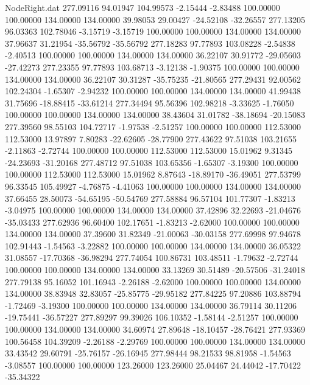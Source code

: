 \begin{filecontents}{NodeRight.dat}
 277.09116   94.01947  104.99573    -2.15444   -2.83488  100.00000  100.00000  134.00000  134.00000   39.98053   29.00427  -24.52108  -32.26557
 277.13205   96.03363  102.78046    -3.15719   -3.15719  100.00000  100.00000  134.00000  134.00000   37.96637   31.21954  -35.56792  -35.56792
 277.18283   97.77893  103.08228    -2.54838   -2.40513  100.00000  100.00000  134.00000  134.00000   36.22107   30.91772  -29.05603  -27.42273
 277.23355   97.77893  103.68713    -3.12138   -1.90375  100.00000  100.00000  134.00000  134.00000   36.22107   30.31287  -35.75235  -21.80565
 277.29431   92.00562  102.24304    -1.65307   -2.94232  100.00000  100.00000  134.00000  134.00000   41.99438   31.75696  -18.88415  -33.61214
 277.34494   95.56396  102.98218    -3.33625   -1.76050  100.00000  100.00000  134.00000  134.00000   38.43604   31.01782  -38.18694  -20.15083
 277.39560   98.55103  104.72717    -1.97538   -2.51257  100.00000  100.00000  112.53000  112.53000   13.97897    7.80283  -22.62605  -28.77900
 277.43622   97.51038  103.21655    -2.11863   -2.72744  100.00000  100.00000  112.53000  112.53000   15.01962    9.31345  -24.23693  -31.20168
 277.48712   97.51038  103.65356    -1.65307   -3.19300  100.00000  100.00000  112.53000  112.53000   15.01962    8.87643  -18.89170  -36.49051
 277.53799   96.33545  105.49927    -4.76875   -4.41063  100.00000  100.00000  134.00000  134.00000   37.66455   28.50073  -54.65195  -50.54769
 277.58884   96.57104  101.77307    -1.83213   -3.04975  100.00000  100.00000  134.00000  134.00000   37.42896   32.22693  -21.04676  -35.03433
 277.62936   96.60400  102.17651    -1.83213   -2.62000  100.00000  100.00000  134.00000  134.00000   37.39600   31.82349  -21.00063  -30.03158
 277.69998   97.94678  102.91443    -1.54563   -3.22882  100.00000  100.00000  134.00000  134.00000   36.05322   31.08557  -17.70368  -36.98294
 277.74054  100.86731  103.48511    -1.79632   -2.72744  100.00000  100.00000  134.00000  134.00000   33.13269   30.51489  -20.57506  -31.24018
 277.79138   95.16052  101.16943    -2.26188   -2.62000  100.00000  100.00000  134.00000  134.00000   38.83948   32.83057  -25.85775  -29.95182
 277.84225   97.20886  103.88794    -1.72469   -3.19300  100.00000  100.00000  134.00000  134.00000   36.79114   30.11206  -19.75441  -36.57227
 277.89297   99.39026  106.10352    -1.58144   -2.51257  100.00000  100.00000  134.00000  134.00000   34.60974   27.89648  -18.10457  -28.76421
 277.93369  100.56458  104.39209    -2.26188   -2.29769  100.00000  100.00000  134.00000  134.00000   33.43542   29.60791  -25.76157  -26.16945
 277.98444   98.21533   98.81958    -1.54563   -3.08557  100.00000  100.00000  123.26000  123.26000   25.04467   24.44042  -17.70422  -35.34322

\end{filecontents}
